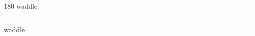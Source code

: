 
\begin{frame}
\begin{center}
\begin{turn}{180}
{\fontsize{2.5cm}{1em}\selectfont waddle}
\end{turn}
\vspace{1em}\par  
\hrule
\vspace{1em}\par  
{\fontsize{2.5cm}{1em}\selectfont waddle}
\end{center}
\end{frame}
